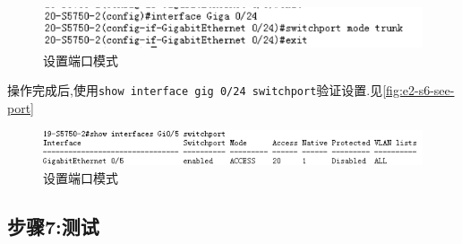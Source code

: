 \documentclass{myreport}
\begin{document}
\begin{figure}[htp]
    \centering
    \includegraphics[width=13cm]{"./figure/2018-05-17-22-57-16.png"}
    \caption{设置端口模式}
    \label{fig:e2-s6-port}
\end{figure}


操作完成后,使用\texttt{show interface gig 0/24 switchport}验证设置.见\autoref{fig:e2-s6-see-port}

\begin{figure}[htp]
    \centering
    \includegraphics[width=13cm]{"./figure/2018-05-17-22-55-38.png"}
    \caption{设置端口模式}
    \label{fig:e2-s6-see-port}
\end{figure}


\subsection{步骤7:测试}
\end{document}
